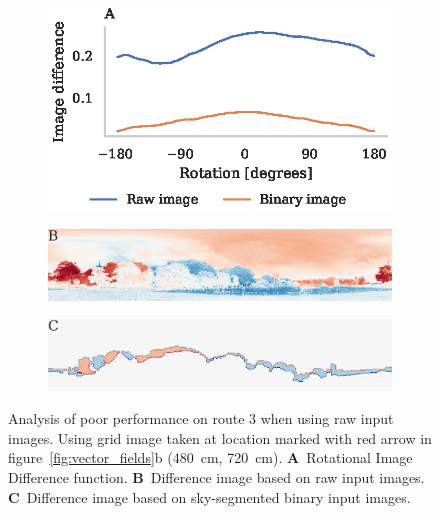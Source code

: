 \documentclass[letterpaper]{article}
\begin{document}
\begin{figure}[t]
    \begin{subfigure}[b]{\columnwidth}
        \includegraphics[width=\columnwidth]{figures/route3_ridf.eps}
    \end{subfigure}
    \begin{subfigure}[b]{\columnwidth}
        \includegraphics[width=\columnwidth]{figures/route3_unwrapped_image_diff.png}
    \end{subfigure}
    \begin{subfigure}[b]{\columnwidth}
        \includegraphics[width=\columnwidth]{figures/route3_mask_image_diff.png}
    \end{subfigure}
    \caption{Analysis of poor performance on route 3 when using raw input images.
    Using grid image taken at location marked with red arrow in figure~\ref{fig:vector_fields}b (\SI{480}{\centi\metre}, \SI{720}{\centi\metre}).
    \textbf{A}~Rotational Image Difference function.
    \textbf{B}~Difference image based on raw input images.
    \textbf{C}~Difference image based on sky-segmented binary input images.}
    \label{fig:light_level}
\end{figure}
\end{document}
